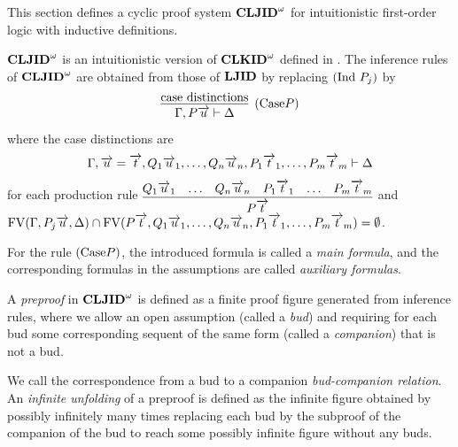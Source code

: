 This section defines
a cyclic proof system ${{\bf CLJID}^\omega}$ for intuitionistic first-order logic
with inductive definitions.

${{\bf CLJID}^\omega}$ is an intuitionistic version of ${{\bf CLKID}^\omega}$ 
defined in \cite{Brotherston11}.
The inference rules of ${{\bf CLJID}^\omega}$ are obtained from
those of ${\bf LJID}$ by replacing $({\rm Ind}\ P_j)$ by
\[
\infer[(\Case P)]{\Gamma, P\Vec u \prove \Delta}{
\hbox{case distinctions}
}
\]
where the case distinctions are
\[
\Gamma,\overrightarrow u=\overrightarrow t,
Q_1\overrightarrow u_1, \ldots, Q_n\overrightarrow u_n, P_1\overrightarrow t_1, \ldots, P_m\overrightarrow t_m
\mathrel \vdash \Delta
\]
for each production rule
$\vcenter{
\infer{P\Vec t}{Q_1\Vec u_1 & \ldots & Q_n\Vec u_n & P_1\Vec t_1 & \ldots & P_m\Vec t_m}
}$
and
${{\rm FV}}(\Gamma,P_j\overrightarrow u, \Delta)
\cap {{\rm FV}}(P\overrightarrow t,Q_1\overrightarrow u_1, \ldots, Q_n\overrightarrow u_n, P_1\overrightarrow t_1, \ldots, P_m\overrightarrow t_m) = \emptyset$.

For the rule $({\rm Case} P)$,
the introduced formula 
is called a {\em main formula},
and the corresponding formulas in the assumptions are called {\em auxiliary
formulas}.

\begin{Def}[Preproof]\rm
A {\em preproof} in ${{\bf CLJID}^\omega}$ is defined as 
a finite proof figure generated from inference rules,
where 
we allow an open assumption (called a {\em bud}) and
requiring for each bud
some corresponding sequent of the same form (called a {\em companion})
that is not a bud.
\end{Def}
We call the correspondence from a bud to a companion {\em bud-companion relation}.
%
An {\em infinite unfolding} of a preproof is defined as
the infinite figure obtained by 
possibly infinitely many times replacing each bud by
the subproof of the companion of the bud 
to reach some possibly infinite figure without any buds.

